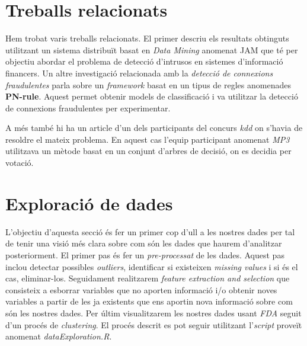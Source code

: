 \documentclass[a4paper]{article} %
\begin{document}

\section{Treballs relacionats}
Hem trobat varis treballs relacionats. El primer\cite{JAM} descriu els resultats obtinguts utilitzant un sistema distribuït basat en \textit{Data Mining} anomenat JAM que té per objectiu abordar el problema de detecció d'intrusos en sistemes d'informació financers.
Un altre investigació relacionada amb la \textit{detecció de connexions fraudulentes}\cite{PNRule} parla sobre un \textit{framework} basat en un tipus de regles anomenades \textbf{PN-rule}. Aquest permet obtenir models de classificació i va utilitzar la detecció de connexions fraudulentes per experimentar.

A més també hi ha un article d'un dels participants del concurs \textit{kdd} on s'havia de resoldre el mateix problema\cite{kdd3}. En aquest cas l'equip participant anomenat \textit{MP3} utilitzava un mètode basat en un conjunt d'arbres de decisió, on es decidia per votació.

\section{Exploració de dades}

L'objectiu d'aquesta secció és fer un primer cop d'ull a les nostres dades per tal de tenir una visió més clara sobre com són les dades que haurem d'analitzar posteriorment.
El primer pas  és fer un \textit{pre-processat} de les dades. Aquest pas inclou detectar possibles \textit{outliers}, identificar si existeixen \textit{missing values} i si és el cas, eliminar-los.
Seguidament realitzarem \textit{feature extraction and selection} que consisteix a esborrar variables que no aporten informació i/o obtenir noves variables a partir de les ja existents que ens aportin nova informació sobre com són les nostres dades. Per últim visualitzarem les nostres dades usant \textit{FDA} seguit d'un procés de \textit{clustering}. El procés descrit es pot seguir utilitzant l'\textit{script} proveït anomenat \textit{dataExploration.R}.
\end{document}
